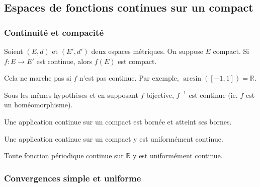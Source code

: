 



  \subsection{Espaces de fonctions continues sur un compact}

  \subsubsection{Continuité et compacité}


  \begin{proposition}
    Soient $(E, d)$ et $(E', d')$ deux espaces métriques. On suppose $E$ compact. Si $f : E \rightarrow E'$ est continue, alors $f(E)$ est compact.
  \end{proposition}

  \begin{cexample}
    Cela ne marche pas si $f$ n'est pas continue. Par exemple, $\arcsin([-1, 1]) = \mathbb{R}$.
  \end{cexample}

  \begin{proposition}
    Sous les mêmes hypothèses et en supposant $f$ bijective, $f^{-1}$ est continue (ie. $f$ est un homéomorphisme).
  \end{proposition}

  \begin{theorem}
    Une application continue sur un compact est bornée et atteint ses bornes.
  \end{theorem}

  \begin{theorem}[Heine]
    Une application continue sur un compact y est uniformément continue.
  \end{theorem}

  \begin{corollary}
    Toute fonction périodique continue sur $\mathbb{R}$ y est uniformément continue.
  \end{corollary}

  \subsubsection{Convergences simple et uniforme}


